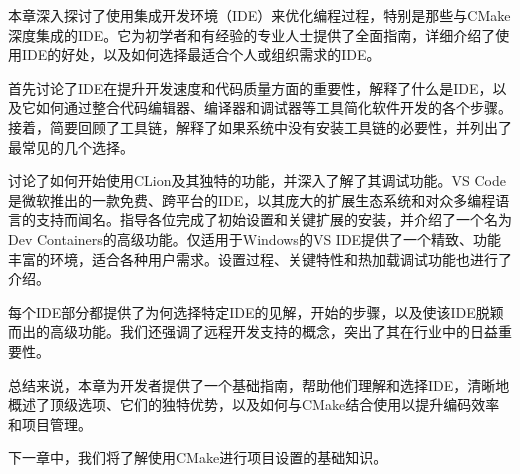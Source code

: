 
本章深入探讨了使用集成开发环境（IDE）来优化编程过程，特别是那些与CMake深度集成的IDE。它为初学者和有经验的专业人士提供了全面指南，详细介绍了使用IDE的好处，以及如何选择最适合个人或组织需求的IDE。

首先讨论了IDE在提升开发速度和代码质量方面的重要性，解释了什么是IDE，以及它如何通过整合代码编辑器、编译器和调试器等工具简化软件开发的各个步骤。接着，简要回顾了工具链，解释了如果系统中没有安装工具链的必要性，并列出了最常见的几个选择。

讨论了如何开始使用CLion及其独特的功能，并深入了解了其调试功能。VS Code是微软推出的一款免费、跨平台的IDE，以其庞大的扩展生态系统和对众多编程语言的支持而闻名。指导各位完成了初始设置和关键扩展的安装，并介绍了一个名为Dev Containers的高级功能。仅适用于Windows的VS IDE提供了一个精致、功能丰富的环境，适合各种用户需求。设置过程、关键特性和热加载调试功能也进行了介绍。

每个IDE部分都提供了为何选择特定IDE的见解，开始的步骤，以及使该IDE脱颖而出的高级功能。我们还强调了远程开发支持的概念，突出了其在行业中的日益重要性。

总结来说，本章为开发者提供了一个基础指南，帮助他们理解和选择IDE，清晰地概述了顶级选项、它们的独特优势，以及如何与CMake结合使用以提升编码效率和项目管理。

下一章中，我们将了解使用CMake进行项目设置的基础知识。